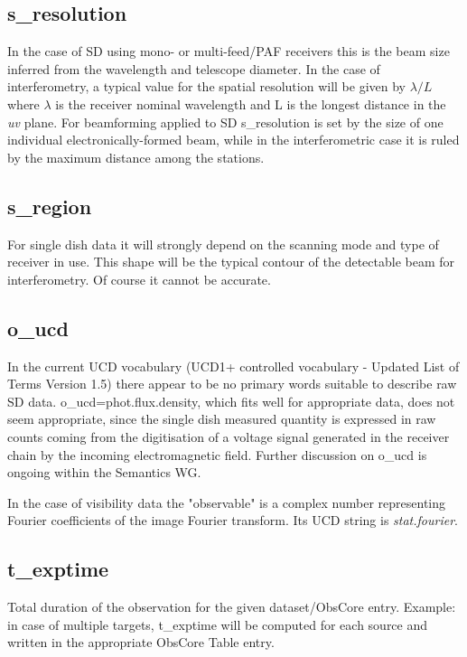 \documentclass[11pt,a4paper]{ivoa}
\begin{document}
\subsection{s\_resolution}
\label{sec:res}
In the case of SD using mono- or multi-feed/PAF receivers this is the beam size inferred from the wavelength and telescope diameter. 
In the case of interferometry, a typical value for the spatial resolution will be given by $\lambda / L$ where $\lambda$ 
is the %
receiver nominal wavelength and L is the longest distance in the \emph{uv} plane.
For beamforming applied to SD s\_resolution is set by the size of one individual electronically-formed beam, while in the interferometric case it is ruled by the maximum distance among the stations.
 
 
\subsection{s\_region}
For single dish data it will strongly depend on the scanning mode and type of receiver in use.
This shape will be the typical contour of the detectable beam for interferometry. Of course it cannot be accurate. 

\subsection{o\_ucd}

In the current UCD vocabulary (UCD1+ controlled vocabulary - Updated List of Terms Version 1.5) there appear to be no primary words suitable to describe raw SD data. o\_ucd=phot.flux.density, which fits well for appropriate data, does not seem appropriate, since the single dish measured quantity is expressed in raw counts coming from the digitisation of a voltage signal generated in the receiver chain by the incoming electromagnetic field. Further discussion on o\_ucd is ongoing within the Semantics WG.

In the case of visibility data the "observable" is a complex number representing Fourier 
coefficients of the image Fourier transform. Its UCD string is \emph{stat.fourier}. 

\subsection{t\_exptime}
Total duration of the observation for the given dataset/ObsCore entry. Example: in case of multiple targets, t\_exptime will be computed for each source and written in the appropriate ObsCore Table entry. 
\end{document}
